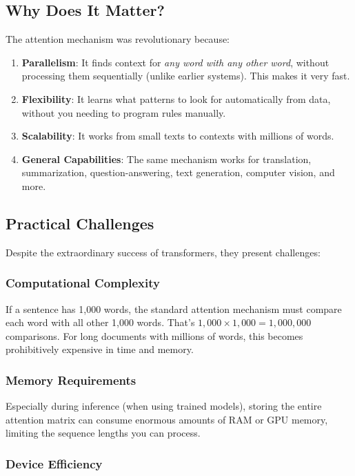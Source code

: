 \subsection{Why Does It Matter?}

The attention mechanism was revolutionary because:
\begin{enumerate}[leftmargin=*]
    \item \textbf{Parallelism}: It finds context for \emph{any word with any other word}, without processing them sequentially (unlike earlier systems). This makes it very fast.
    \item \textbf{Flexibility}: It learns what patterns to look for automatically from data, without you needing to program rules manually.
    \item \textbf{Scalability}: It works from small texts to contexts with millions of words.
    \item \textbf{General Capabilities}: The same mechanism works for translation, summarization, question-answering, text generation, computer vision, and more.
\end{enumerate}

\subsection{Practical Challenges}

Despite the extraordinary success of transformers, they present challenges:

\subsubsection{Computational Complexity}

If a sentence has 1,000 words, the standard attention mechanism must compare each word with all other 1,000 words. That's $1,000 \times 1,000 = 1,000,000$ comparisons. For long documents with millions of words, this becomes prohibitively expensive in time and memory.

\subsubsection{Memory Requirements}

Especially during inference (when using trained models), storing the entire attention matrix can consume enormous amounts of RAM or GPU memory, limiting the sequence lengths you can process.

\subsubsection{Device Efficiency}

